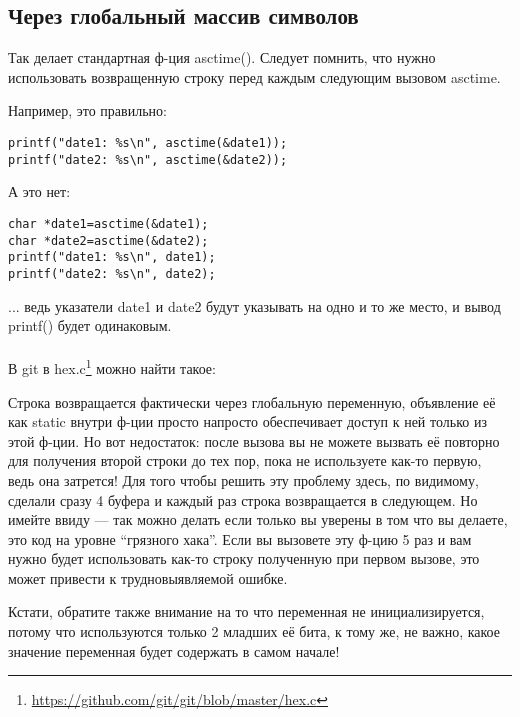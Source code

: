 \subsection{Через глобальный массив символов}

Так делает стандартная ф-ция asctime(). Следует помнить, что нужно использовать возвращенную строку
перед каждым следующим вызовом asctime. 

Например, это правильно:

\begin{lstlisting}
printf("date1: %s\n", asctime(&date1));
printf("date2: %s\n", asctime(&date2));
\end{lstlisting}

А это нет:

\begin{lstlisting}
char *date1=asctime(&date1);
char *date2=asctime(&date2);
printf("date1: %s\n", date1);
printf("date2: %s\n", date2);
\end{lstlisting}

... ведь указатели date1 и date2 будут указывать на одно и то же место, и вывод printf() будет одинаковым. \\
\\
В git в hex.c\footnote{\url{https://github.com/git/git/blob/master/hex.c}} можно найти такое:



Строка возвращается фактически через глобальную переменную, объявление её как static внутри ф-ции просто напросто
обеспечивает доступ к ней только из этой ф-ции. Но вот недостаток: после вызова  вы не можете
вызвать её повторно для получения второй строки до тех пор, пока не используете как-то первую, ведь она
затрется! Для того чтобы решить эту проблему здесь, по видимому, сделали сразу 4 буфера и каждый раз строка
возвращается в следующем. Но имейте ввиду --- так можно делать если только вы уверены в том что вы делаете,
это код на уровне ``грязного хака''.
Если вы
вызовете эту ф-цию 5 раз и вам нужно будет использовать как-то строку полученную при первом вызове, это может
привести к трудновыявляемой ошибке.

Кстати, обратите также внимание на то что переменная  не инициализируется, потому что используются только 
2 младших её бита, к тому же, не важно, какое значение переменная будет содержать в самом начале!
